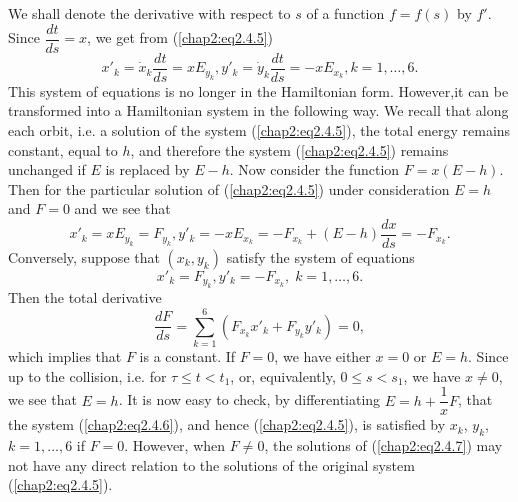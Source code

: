 We shall denote the derivative with respect to $s$ of a function $f = f(s)$ by $f'$. Since $\dfrac{dt}{ds} = x$, we get from (\ref{chap2:eq2.4.5})
\begin{equation*}
x'_k = \dot{x}_k \frac{dt}{ds} = x E_{y_k}, y'_k = \dot{y}_k \frac{dt}{ds} = - xE_{x_k}, k = 1, \ldots, 6.\tag{2.4.6}\label{chap2:eq2.4.6} 
\end{equation*}
This system of equations is no longer in the Hamiltonian form. However,\pageoriginale it can be transformed into a Hamiltonian system in the following way. We recall that along each orbit, i.e. a solution of the system (\ref{chap2:eq2.4.5}), the total energy remains constant, equal to $h$, and therefore the system (\ref{chap2:eq2.4.5}) remains unchanged if $E$ is replaced by $E-h$. Now consider the function $F = x(E-h)$. Then for the particular solution of (\ref{chap2:eq2.4.5}) under consideration $E =h$ and $F=0$ and we see that
$$
x'_k = x E_{y_k} = F_{y_k}, y'_k = - x E_{x_k} = - F_{x_k} + (E-h) \frac{dx}{ds} = - F_{x_k}. 
$$
Conversely, suppose that $(x_k, y_k)$ satisfy the system of equations
\begin{equation*}
x'_k = F_{y_k}, y'_k = - F_{x_k}, \; k = 1, \ldots, 6. \tag{2.4.7}\label{chap2:eq2.4.7} 
\end{equation*}
Then the total derivative 
$$
\frac{dF}{ds} = \sum\limits^6_{k=1} (F_{x_k} x'_k + F_{y_k} y'_k) = 0,
$$
which implies that $F$ is a constant. If $F = 0$, we have either $x=0$ or $E=h$. Since up to the collision, i.e. for $\tau \leq t < t_1$, or, equivalently, $0\leq s < s_1$, we have $x \neq 0$, we see that $E = h$. It is now easy to check, by differentiating $E = h + \dfrac{1}{x}F$, that the system (\ref{chap2:eq2.4.6}), and hence (\ref{chap2:eq2.4.5}), is satisfied by $x_k$, $y_k$, $k = 1, \ldots, 6$ if $F=0$. However, when $F \neq 0$, the solutions of (\ref{chap2:eq2.4.7}) may not have any direct relation to the solutions of the original system (\ref{chap2:eq2.4.5}).

